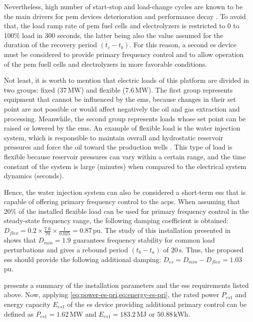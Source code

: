 \documentclass[utf8]{frontiersSCNS} %
\begin{document}
Nevertheless, high number of start-stop and load-change cycles are known to be the main drivers for \gls{pem} devices deterioration and performance decay \citep{peiQuickEvaluatingMethod2008}. To avoid that, the load ramp rate of \gls{pem} fuel cells and electrolyzers is restricted to 0 to 100\% load in 300 seconds, the latter being also the value assumed for the duration of the recovery period $(t_c - t_b)$. For this reason, a second \gls{es} device must be considered to provide primary frequency control and to allow operation of the \gls{pem} fuell cells and electrolyzers in more favorable conditions. 

Not least, it is worth to mention that electric loads of this platform are divided in two groups: fixed ($37\,\si{\mega\watt}$) and flexible ($7.6\,\si{\mega\watt}$). The first group represents equipment that cannot be influenced by the \gls{ems}, because changes in their set point are not possible or would affect negatively the oil and gas extraction and processing. Meanwhile, the second group represents loads whose set point can be raised or lowered by the \gls{ems}. An example of flexible load is the water injection system, which is responsible to maintain overall and hydrostatic reservoir pressures and force the oil toward the production wells \citep{devoldOilGasProduction2013}. This type of load is flexible because reservoir pressures can vary within a certain range, and the time constant of the system is large (minutes) when compared to the electrical system dynamics (seconds).

Hence, the water injection system can also be considered a short-term \gls{ess} that is capable of offering primary frequency control to the \gls{acps}. When assuming that 20\% of the installed flexible load can be used for primary frequency control in the steady-state frequency range, the following damping coefficient is obtained: $D_{flex} = 0.2 \times \frac{7.6}{70}  \times \frac{1}{0.025} = 0.87 $\,pu. The study of this installation presented in \cite{alvesSufficientConditionsRobust2020} shows that $D_{min} = 1.9 $ guarantees frequency stability for common load perturbations and gives a rebound period $(t_b - t_a)$ of $20\,\si{\second}$. Thus, the proposed \gls{ess} should provide the following additional damping: $D_{es} = D_{min} - D_{flex} = 1.03$\,pu.

 presents a summary of the installation parameters and the \gls{ess} requirements listed above. Now, applying \cref{eq:power-es-pri,eq:energy-es-pri}, the rated power $P_{es1}$ and energy capacity $E_{es1}$ of the \gls{es} device providing additional primary control can be defined as $P_{es1} = 1.62\,\si{\mega\watt}$ and $E_{es1} = 183.2\,\si{\mega\joule}$ or $50.88\,\si{\kilo\watt\hour}$.
\end{document}
